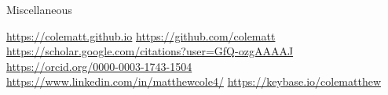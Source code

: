 
\begin{rubric}{Miscellaneous}

  
   \url{https://colematt.github.io}
  \entry*[Github] \url{https://github.com/colematt}
   \url{https://scholar.google.com/citations?user=GfQ-ozgAAAAJ}
  \entry*[OrcID] \url{https://orcid.org/0000-0003-1743-1504}
  \entry*[LinkedIn] \url{https://www.linkedin.com/in/matthewcole4/}
  \entry*[Keybase] \url{https://keybase.io/colematthew}

\end{rubric}
